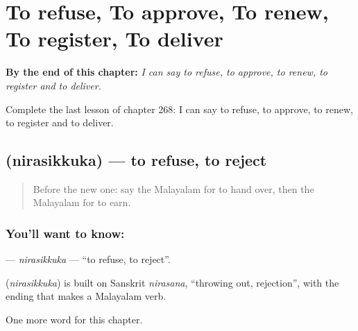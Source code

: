 
\chapter{To refuse, To approve, To renew, To register, To deliver}
\label{ch:ml-to-refuse-to-approve-to-renew-to-register-to-deliver}

\begin{chapteropening}
\textbf{By the end of this chapter:} \emph{I can say to refuse, to approve, to renew, to register and to deliver.}

Complete the last lesson of chapter 268: I can say to refuse, to approve, to renew, to register and to deliver.
\end{chapteropening}

\section[\texorpdfstring{\ml{നിരസിക്കുക} (nirasikkuka)}{നിരസിക്കുക (nirasikkuka)}]{ (nirasikkuka) — to refuse, to reject}

\label{lesson:ML-C268-nirasikkuka}



\begin{quote}
Before the new one: say the Malayalam for to hand over, then the Malayalam for to earn.
\end{quote}

\subsection*{You'll want to know: }
\textbf{} — \emph{nirasikkuka} — \textquotedblleft{}to refuse, to reject\textquotedblright{}.

\begin{cousinweb}
\textbf{} (\emph{nirasikkuka}) is built on Sanskrit \emph{nirasana}, \textquotedblleft{}throwing out, rejection\textquotedblright{}, with the ending that makes a Malayalam verb.
\end{cousinweb}

\begin{grammarlens}[title={What you've built}]
One more word for this chapter.
\end{grammarlens}

